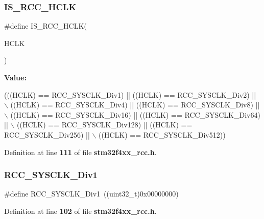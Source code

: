 \subsubsection{I\+S\+\_\+\+R\+C\+C\+\_\+\+H\+C\+LK}
{\footnotesize\ttfamily \#define I\+S\+\_\+\+R\+C\+C\+\_\+\+H\+C\+LK(\begin{DoxyParamCaption}\item[{}]{H\+C\+LK }\end{DoxyParamCaption})}

{\bfseries Value\+:}
\begin{DoxyCode}
(((HCLK) == RCC_SYSCLK_Div1) || ((HCLK) == RCC_SYSCLK_Div2) || \(\backslash\)
                           ((HCLK) == RCC_SYSCLK_Div4) || ((HCLK) == 
      RCC_SYSCLK_Div8) || \(\backslash\)
                           ((HCLK) == RCC_SYSCLK_Div16) || ((HCLK) == 
      RCC_SYSCLK_Div64) || \(\backslash\)
                           ((HCLK) == RCC_SYSCLK_Div128) || ((HCLK) == 
      RCC_SYSCLK_Div256) || \(\backslash\)
                           ((HCLK) == RCC_SYSCLK_Div512))
\end{DoxyCode}


Definition at line \textbf{ 111} of file \textbf{ stm32f4xx\+\_\+rcc.\+h}.

\mbox{\label{group__RCC__AHB__Clock__Source_gadc3ac37d90c2082d640e5948fac0878f}} 
\subsubsection{R\+C\+C\+\_\+\+S\+Y\+S\+C\+L\+K\+\_\+\+Div1}
{\footnotesize\ttfamily \#define R\+C\+C\+\_\+\+S\+Y\+S\+C\+L\+K\+\_\+\+Div1~((uint32\+\_\+t)0x00000000)}



Definition at line \textbf{ 102} of file \textbf{ stm32f4xx\+\_\+rcc.\+h}.

\mbox{\label{group__RCC__AHB__Clock__Source_ga1a28926fcb86112058a365e01fe9a46b}} 
